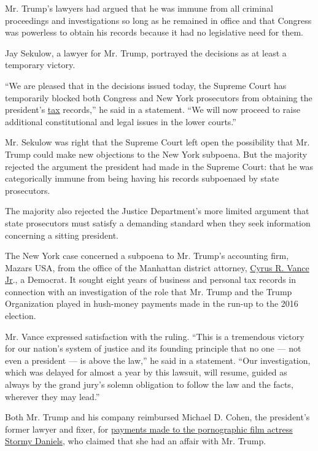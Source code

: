 Mr. Trump's lawyers had argued that he was immune from all criminal
proceedings and investigations so long as he remained in office and that
Congress was powerless to obtain his records because it had no
legislative need for them.

Jay Sekulow, a lawyer for Mr. Trump, portrayed the decisions as at least
a temporary victory.

``We are pleased that in the decisions issued today, the Supreme Court
has temporarily blocked both Congress and New York prosecutors from
obtaining the president's
\href{https://www.nytimes.com/2020/07/09/us/politics/trump-taxes.html}{tax}
records,'' he said in a statement. ``We will now proceed to raise
additional constitutional and legal issues in the lower courts.''

Mr. Sekulow was right that the Supreme Court left open the possibility
that Mr. Trump could make new objections to the New York subpoena. But
the majority rejected the argument the president had made in the Supreme
Court: that he was categorically immune from being having his records
subpoenaed by state prosecutors.

The majority also rejected the Justice Department's more limited
argument that state prosecutors must satisfy a demanding standard when
they seek information concerning a sitting president.

The New York case concerned a subpoena to Mr. Trump's accounting firm,
Mazars USA, from the office of the Manhattan district attorney,
\href{https://www.nytimes.com/2020/07/10/nyregion/donald-trump-taxes-cy-vance.html}{Cyrus
R. Vance Jr}., a Democrat. It sought eight years of business and
personal tax records in connection with an investigation of the role
that Mr. Trump and the Trump Organization played in hush-money payments
made in the run-up to the 2016 election.

Mr. Vance expressed satisfaction with the ruling. ``This is a tremendous
victory for our nation's system of justice and its founding principle
that no one --- not even a president --- is above the law,'' he said in
a statement. ``Our investigation, which was delayed for almost a year by
this lawsuit, will resume, guided as always by the grand jury's solemn
obligation to follow the law and the facts, wherever they may lead.''

Both Mr. Trump and his company reimbursed Michael D. Cohen, the
president's former lawyer and fixer, for
\href{https://www.nytimes.com/2018/05/03/us/politics/stormy-daniels-trump-payment.html}{payments
made to the pornographic film actress Stormy Daniels}, who claimed that
she had an affair with Mr. Trump.

